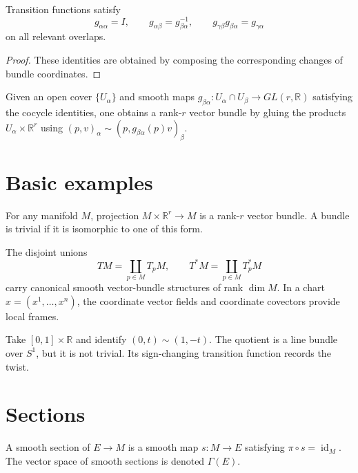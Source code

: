 \begin{theorem}\label{thm:vii07-cocycle}
Transition functions satisfy
\[
g_{\alpha\alpha}=I,\qquad
g_{\alpha\beta}=g_{\beta\alpha}^{-1},\qquad
g_{\gamma\beta}g_{\beta\alpha}=g_{\gamma\alpha}
\]
on all relevant overlaps.
\end{theorem}
\begin{proof}
These identities are obtained by composing the corresponding changes of bundle coordinates.
\end{proof}

\begin{theorem}\label{thm:vii07-gluing}
Given an open cover \(\{U_\alpha\}\) and smooth maps \(g_{\beta\alpha}:U_\alpha\cap U_\beta\to GL(r,\mathbb R)\) satisfying the cocycle identities, one obtains a rank-\(r\) vector bundle by gluing the products \(U_\alpha\times\mathbb R^r\) using
\((p,v)_\alpha\sim(p,g_{\beta\alpha}(p)v)_\beta\).
\end{theorem}

\section{Basic examples}
\begin{example}\label{ex:vii07-trivial}
For any manifold \(M\), projection \(M\times\mathbb R^r\to M\) is a rank-\(r\) vector bundle. A bundle is trivial if it is isomorphic to one of this form.
\end{example}

\begin{example}\label{ex:vii07-tangent-cotangent}
The disjoint unions
\[
TM=\coprod_{p\in M}T_pM,\qquad T^*M=\coprod_{p\in M}T_p^*M
\]
carry canonical smooth vector-bundle structures of rank \(\dim M\). In a chart \(x=(x^1,\ldots,x^n)\), the coordinate vector fields and coordinate covectors provide local frames.
\end{example}

\begin{example}\label{ex:vii07-mobius}
Take \([0,1]\times\mathbb R\) and identify \((0,t)\sim(1,-t)\). The quotient is a line bundle over \(S^1\), but it is not trivial. Its sign-changing transition function records the twist.
\end{example}

\section{Sections}
\begin{definition}\label{def:vii07-section}
A smooth section of \(E\to M\) is a smooth map \(s:M\to E\) satisfying \(\pi\circ s=\operatorname{id}_M\). The vector space of smooth sections is denoted \(\Gamma(E)\).
\end{definition}

